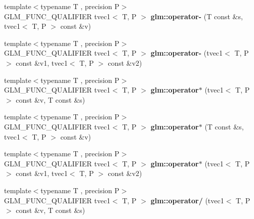 \begin{DoxyCompactItemize}
\item 
\hypertarget{namespaceglm_a0f1b65cfd22daf797ee0d91054796092}{{\footnotesize template$<$typename T , precision P$>$ }\\G\-L\-M\-\_\-\-F\-U\-N\-C\-\_\-\-Q\-U\-A\-L\-I\-F\-I\-E\-R tvec1$<$ T, P $>$ {\bfseries glm\-::operator-\/} (T const \&s, tvec1$<$ T, P $>$ const \&v)}\label{namespaceglm_a0f1b65cfd22daf797ee0d91054796092}

\item 
\hypertarget{namespaceglm_a1c711f6ec4149bf2353559dce01d3905}{{\footnotesize template$<$typename T , precision P$>$ }\\G\-L\-M\-\_\-\-F\-U\-N\-C\-\_\-\-Q\-U\-A\-L\-I\-F\-I\-E\-R tvec1$<$ T, P $>$ {\bfseries glm\-::operator-\/} (tvec1$<$ T, P $>$ const \&v1, tvec1$<$ T, P $>$ const \&v2)}\label{namespaceglm_a1c711f6ec4149bf2353559dce01d3905}

\item 
\hypertarget{namespaceglm_a7393736342ff667b717c3e78bd1f267c}{{\footnotesize template$<$typename T , precision P$>$ }\\G\-L\-M\-\_\-\-F\-U\-N\-C\-\_\-\-Q\-U\-A\-L\-I\-F\-I\-E\-R tvec1$<$ T, P $>$ {\bfseries glm\-::operator$\ast$} (tvec1$<$ T, P $>$ const \&v, T const \&s)}\label{namespaceglm_a7393736342ff667b717c3e78bd1f267c}

\item 
\hypertarget{namespaceglm_a5e1246e1869cdef6276dfe57fa9852e3}{{\footnotesize template$<$typename T , precision P$>$ }\\G\-L\-M\-\_\-\-F\-U\-N\-C\-\_\-\-Q\-U\-A\-L\-I\-F\-I\-E\-R tvec1$<$ T, P $>$ {\bfseries glm\-::operator$\ast$} (T const \&s, tvec1$<$ T, P $>$ const \&v)}\label{namespaceglm_a5e1246e1869cdef6276dfe57fa9852e3}

\item 
\hypertarget{namespaceglm_a5e9aeb3518efcd20d4f0ab05b7c69c0d}{{\footnotesize template$<$typename T , precision P$>$ }\\G\-L\-M\-\_\-\-F\-U\-N\-C\-\_\-\-Q\-U\-A\-L\-I\-F\-I\-E\-R tvec1$<$ T, P $>$ {\bfseries glm\-::operator$\ast$} (tvec1$<$ T, P $>$ const \&v1, tvec1$<$ T, P $>$ const \&v2)}\label{namespaceglm_a5e9aeb3518efcd20d4f0ab05b7c69c0d}

\item 
\hypertarget{namespaceglm_ab25a6fe82fcd51660f8cee50bd52e09e}{{\footnotesize template$<$typename T , precision P$>$ }\\G\-L\-M\-\_\-\-F\-U\-N\-C\-\_\-\-Q\-U\-A\-L\-I\-F\-I\-E\-R tvec1$<$ T, P $>$ {\bfseries glm\-::operator/} (tvec1$<$ T, P $>$ const \&v, T const \&s)}\label{namespaceglm_ab25a6fe82fcd51660f8cee50bd52e09e}


\end{DoxyCompactItemize}
